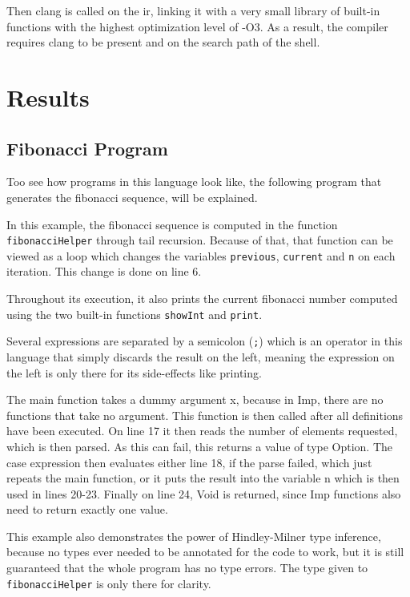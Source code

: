 \documentclass[12pt]{article}
\newcommand{\importListing}[1]{
    \begin{minipage}{\textwidth}
    
    \end{minipage}
}
\begin{document}
Then clang is called on the \Gls{ir}, linking it with a very small library of built-in
functions with the highest optimization level of -O3. As a result, the compiler requires
clang to be present and on the search path of the shell.

\section{Results}
\subsection{Fibonacci Program}
Too see how programs in this language look like, the following program that generates the fibonacci sequence,
will be explained.

\importListing{code/fibonacci.tex}

In this example, the fibonacci sequence is computed in the function
\texttt{fibonacciHelper} through tail recursion. Because of that, that function
can be viewed as a loop which changes the variables \texttt{previous}, \texttt{current} and
\texttt{n} on each iteration. This change is done on line 6.

Throughout its execution, it also prints the current fibonacci number
computed using the two built-in functions \texttt{showInt} and \texttt{print}.

Several expressions are separated by a semicolon (\texttt{;}) which is an operator
in this language that simply discards the result on the left, meaning
the expression on the left is only there for its side-effects like printing.

The main function takes a dummy argument x, because in Imp, there are no
functions that take no argument. This function is then called
after all definitions have been executed.
On line 17 it then reads the number of elements requested,
which is then parsed. As this can fail, this returns a
value of type Option. The case expression then evaluates either line
18, if the parse failed, which just repeats the main function,
or it puts the result into the variable n which is then used in
lines 20-23. Finally on line 24, Void is returned, since Imp functions
also need to return exactly one value.

This example also demonstrates the power of Hindley-Milner type inference,
because no types ever needed to be annotated for the code to work,
but it is still guaranteed that the whole program has no type errors.
The type given to \texttt{fibonacciHelper} is only there for clarity.
\end{document}
